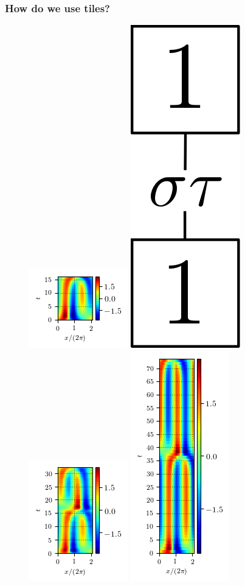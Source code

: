 \documentclass[mathserif, handout]{beamer}
\begin{document}
\begin{frame}%
  \frametitle{ How do we use tiles?}
  \begin{figure}
  \includegraphics[width=.22\textwidth]{MNG_half_final}
  \includegraphics[width=.1\textwidth,height=.25\textheight]{MNG11symb}
  \includegraphics[width=.22\textwidth]{MNG11init}
  \includegraphics[width=.22\textwidth]{MNG11final}
  \end{figure}
\end{frame}
\end{document}
